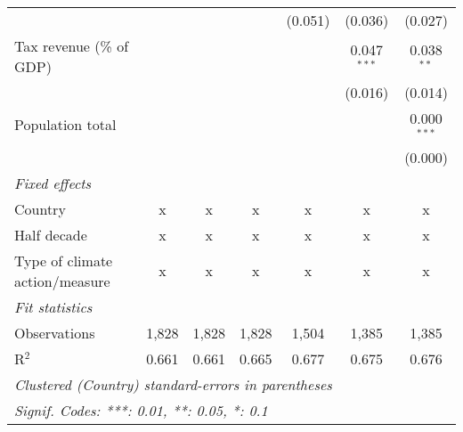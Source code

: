 \begin{tabular}{lcccccc}
                                                              &         &         &                & (0.051)        & (0.036)        & (0.027)\\   
   Tax revenue (\% of GDP)                                    &         &         &                &                & 0.047$^{***}$  & 0.038$^{**}$\\   
                                                              &         &         &                &                & (0.016)        & (0.014)\\   
   Population total                                           &         &         &                &                &                & 0.000$^{***}$\\   
                                                              &         &         &                &                &                & (0.000)\\   
   \emph{Fixed effects}\\
   Country                                                    & x       & x       & x              & x              & x              & x\\  
   Half decade                                                & x       & x       & x              & x              & x              & x\\  
   Type of climate action/measure                             & x       & x       & x              & x              & x              & x\\  
   \midrule \emph{Fit statistics}\\
   Observations                                               & 1,828   & 1,828   & 1,828          & 1,504          & 1,385          & 1,385\\  
   R$^2$                                                      & 0.661   & 0.661   & 0.665          & 0.677          & 0.675          & 0.676\\  
   \midrule
   \multicolumn{7}{l}{\emph{Clustered (Country) standard-errors in parentheses}}\\
   \multicolumn{7}{l}{\emph{Signif. Codes: ***: 0.01, **: 0.05, *: 0.1}}\\
\end{tabular}
\par\endgroup


